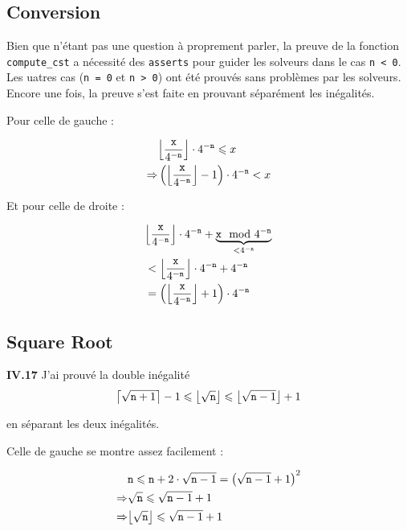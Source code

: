 \documentclass[9pt,a4paper,twocolumn]{article}
\theoremstyle{definition}
\DeclarePairedDelimiter\ceil{\lceil}{\rceil}
\DeclarePairedDelimiter\floor{\lfloor}{\rfloor}
\renewcommand{\leq}{\leqslant}
\begin{document}
\subsection{Conversion}

Bien que n'étant pas une question à proprement parler, la preuve de la fonction
\texttt{compute\_cst} a nécessité des \texttt{asserts} pour guider les solveurs
dans le cas \texttt{n < 0}. Les uatres cas (\texttt{n = 0} et \texttt{n > 0})
ont été prouvés sans problèmes par les solveurs.
Encore une fois, la preuve s'est faite en prouvant séparément les inégalités.

Pour celle de gauche :

\begin{align*}
   &\floor*{\frac{\texttt{x}}{4^{-\texttt{n}}}}\cdot 4^{-\texttt{n}}
      \leq x\\
\Rightarrow
   &\left(\floor*{\frac{\texttt{x}}{4^{-\texttt{n}}}}-1\right)\cdot 4^{-\texttt{n}}
      < x\\
\end{align*}

Et pour celle de droite :

\begin{align*}
   &\floor*{\frac{\texttt{x}}{4^{-\texttt{n}}}}\cdot 4^{-\texttt{n}}
      + \underbrace{\texttt{x} \mod 4^{-\texttt{n}}}_{<4^{-\texttt{n}}} \\
   &< \floor*{\frac{\texttt{x}}{4^{-\texttt{n}}}}\cdot 4^{-\texttt{n}}
      + 4^{-\texttt{n}} \\
   & = \left(\floor*{\frac{\texttt{x}}{4^{-\texttt{n}}}}+1\right)\cdot 4^{-\texttt{n}}
\end{align*}

\subsection{Square Root}


\textbf{IV.17}
J'ai prouvé la double inégalité
\begin{equation}
\ceil*{\sqrt{\texttt{n}+1}} -1
\leq \floor*{\sqrt{\texttt{n}}}
\leq \floor*{\sqrt{\texttt{n}-1}}+1
\label{eq:sqrt}
\end{equation}

en séparant les deux inégalités.

Celle de gauche se montre assez facilement :

\begin{align*}
   &\texttt{n} \leq \texttt{n} +2\cdot\sqrt{\texttt{n}-1}
      =\left(\sqrt{\texttt{n}-1}+1\right)^2\\
\Rightarrow
    &\sqrt{ \texttt{n} } \leq \sqrt{\texttt{n}-1}+1 \\
 \Rightarrow
        &\floor*{\sqrt{ \texttt{n} }} \leq \sqrt{\texttt{n}-1}+1 \\
\end{align*}
\end{document}
